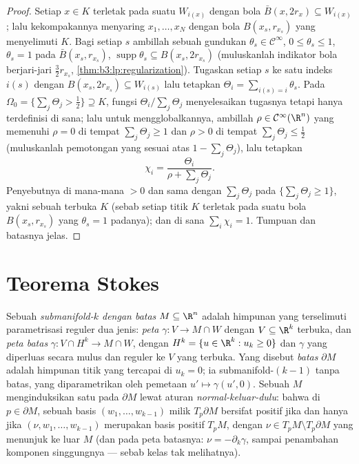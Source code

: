 \begin{proof}
Setiap $x \in K$ terletak pada suatu $W_{i(x)}$ dengan bola 
$\bar B(x, 2r_x) \subseteq W_{i(x)}$; lalu kekompakannya menyaring
$x_1, \dots, x_N$ dengan bola $B(x_s, r_{x_s})$ yang menyelimuti
$K$. Bagi setiap $s$ ambillah sebuah gundukan $\theta_s \in \mathcal
C^\infty$, $0 \leq \theta_s \leq 1$, $\theta_s = 1$ pada
$\bar B(x_s, r_{x_s})$, $\operatorname{supp}\theta_s
\subseteq B(x_s, 2r_{x_s})$ (muluskanlah indikator
bola berjari-jari $\frac32r_{x_s}$,
\cref{thm:b3:lp:regularization}). Tugaskan setiap $s$ ke satu
indeks $i(s)$ dengan $B(x_s, 2r_{x_s}) \subseteq W_{i(s)}$ lalu
tetapkan $\Theta_i = \sum_{i(s) = i}\theta_s$. Pada 
$\Omega_0 = \{\sum_j\Theta_j > \tfrac12\} \supseteq K$,
fungsi $\Theta_i/\sum_j\Theta_j$ menyelesaikan tugasnya tetapi hanya
terdefinisi di sana; lalu untuk mengglobalkannya, ambillah $\rho \in \mathcal
C^\infty(\R^n)$ yang memenuhi $\rho = 0$ di tempat $\sum_j\Theta_j
\geq 1$ dan $\rho > 0$ di tempat $\sum_j\Theta_j \leq \tfrac12$
(muluskanlah pemotongan yang sesuai atas $1 - \sum_j\Theta_j$), lalu
tetapkan
\[
\chi_i = \frac{\Theta_i}{\rho + \sum_j\Theta_j} .
\]
Penyebutnya di mana-mana $> 0$ dan sama dengan
$\sum_j\Theta_j$ pada $\{\sum_j\Theta_j \geq 1\}$, yakni sebuah
 terbuka $K$ (sebab setiap titik $K$ terletak pada suatu bola
$B(x_s, r_{x_s})$ yang $\theta_s = 1$ padanya); dan di sana
$\sum_i\chi_i = 1$. Tumpuan dan batasnya jelas.
\end{proof}

\section{Teorema Stokes}

\begin{definition}\label{def:b3:forms:boundary}
Sebuah \emph{submanifold-$k$ dengan batas} $M \subseteq \R^n$ adalah himpunan yang terselimuti
parametrisasi reguler dua jenis: \emph{peta }
$\gamma\colon V \to M \cap W$ dengan $V \subseteq \R^k$ terbuka,
dan \emph{peta batas} $\gamma\colon V \cap H^k \to M
\cap W$, dengan $H^k = \{u \in \R^k : u_k \geq 0\}$ dan
$\gamma$ yang diperluas secara mulus dan reguler ke $V$ yang terbuka.
Yang disebut \emph{batas} $\partial M$ adalah himpunan titik yang
tercapai di $u_k = 0$; ia submanifold-$(k-1)$ tanpa
batas, yang diparametrikan oleh pemetaan $u' \mapsto \gamma(u',
0)$. Sebuah  $M$ menginduksikan satu  pada $\partial M$ lewat
aturan \emph{normal-keluar-dulu}: bahwa di $p \in \partial M$,
sebuah basis $(w_1, \dots, w_{k-1})$ milik $T_p\partial M$ bersifat
positif jika dan hanya jika $(\nu, w_1, \dots, w_{k-1})$ merupakan basis
positif $T_pM$, dengan $\nu \in T_pM \setminus T_p\partial M$
yang menunjuk ke luar $M$ (dan pada peta batasnya: $\nu =
-\partial_k\gamma$, sampai penambahan komponen singgungnya ---
sebab kelas  tak melihatnya).
\end{definition}

